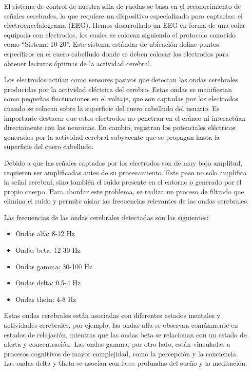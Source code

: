 \documentclass{article}
\begin{document}
El sistema de control de nuestra silla de ruedas se basa en el reconocimiento de señales cerebrales, lo que requiere un dispositivo especializado para captarlas: el electroencefalograma (EEG). Hemos desarrollado un EEG en forma de una cofia equipada con electrodos, los cuales se colocan siguiendo el protocolo conocido como “Sistema 10-20”. Este sistema estándar de ubicación define puntos específicos en el cuero cabelludo donde se deben colocar los electrodos para obtener lecturas óptimas de la actividad cerebral.

Los electrodos actúan como sensores pasivos que detectan las ondas cerebrales producidas por la actividad eléctrica del cerebro. Estas ondas se manifiestan como pequeñas fluctuaciones en el voltaje, que son captadas por los electrodos cuando se colocan sobre la superficie del cuero cabelludo del usuario. Es importante destacar que estos electrodos no penetran en el cráneo ni interactúan directamente con las neuronas. En cambio, registran los potenciales eléctricos generados por la actividad cerebral subyacente que se propagan hasta la superficie del cuero cabelludo.

Debido a que las señales captadas por los electrodos son de muy baja amplitud, requieren ser amplificadas antes de su procesamiento. Este paso no solo amplifica la señal cerebral, sino también el ruido presente en el entorno o generado por el propio cuerpo. Para abordar este problema, se realiza un proceso de filtrado que elimina el ruido y permite aislar las frecuencias relevantes de las ondas cerebrales.

Las frecuencias de las ondas cerebrales detectadas son las siguientes:

\begin{itemize}
    \item Ondas alfa: 8-12 Hz
    \item Ondas beta: 12-30 Hz
    \item Ondas gamma: 30-100 Hz
    \item Ondas delta: 0,5-4 Hz
    \item Ondas theta: 4-8 Hz
\end{itemize}

Estas ondas cerebrales están asociadas con diferentes estados mentales y actividades cerebrales, por ejemplo, las ondas alfa se observan comúnmente en estados de relajación, mientras que las ondas beta se relacionan con un estado de alerta y concentración. Las ondas gamma, por otro lado, están vinculadas a procesos cognitivos de mayor complejidad, como la percepción y la conciencia. Las ondas delta y theta se asocian con fases profundas del sueño y la meditación.
\end{document}
